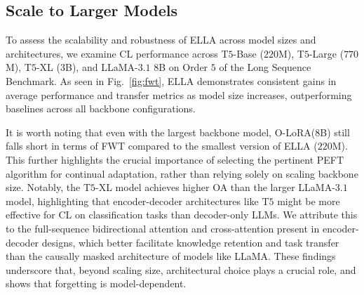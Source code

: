 \documentclass[11pt]{article}
\begin{document}
\subsection{Scale to Larger Models}
To assess the scalability and robustness of ELLA across model sizes and architectures, we examine CL performance across T$5$-Base ($220$M), T$5$-Large ($770$M), T$5$-XL ($3$B), and LLaMA-$3.1$ $8$B on Order $5$ of the Long Sequence Benchmark. As seen in Fig.~\ref{fig:fwt}, ELLA demonstrates consistent gains in average performance and transfer metrics as model size increases, outperforming baselines across all backbone configurations. 

It is worth noting that even with the largest backbone model, O-LoRA($8$B) still falls short in terms of FWT compared to the smallest version of ELLA ($220$M). This further highlights the crucial importance of selecting the pertinent PEFT algorithm for continual adaptation, rather than relying solely on scaling backbone size. Notably, the T$5$-XL model achieves higher OA than the larger LLaMA-$3.1$ model, highlighting that encoder-decoder architectures like T$5$ might be more effective for CL on classification tasks than decoder-only LLMs. We attribute this to the full-sequence bidirectional attention and cross-attention present in encoder-decoder designs, which better facilitate knowledge retention and task transfer than the causally masked architecture of models like LLaMA. These findings underscore that, beyond scaling size, architectural choice plays a crucial role, and shows that forgetting is model-dependent. %
\end{document}
